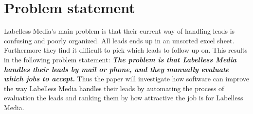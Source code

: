 \section{Problem statement}
Labelless Media's main problem is that their current way of handling leads is confusing and poorly organized. All leads ends up in an unsorted excel sheet. Furthermore they find it difficult to pick which leads to follow up on.
\newline \noindent
This results in the following problem statement:
\newline \newline \noindent
\textbf{\textit{The problem is that Labelless Media handles their leads by mail or phone, and they manually evaluate which jobs to accept.}}
\newline \newline \noindent
Thus the paper will investigate how software can improve the way Labelless Media handles their leads by automating the process of evaluation the leads and ranking them by how attractive the job is for Labelless Media.

